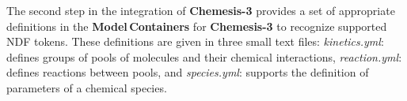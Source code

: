 \documentclass[11pt,3p,twocolumn]{JMN}
\begin{document}









The second step in the integration of {\bf Chemesis-3} provides a set of appropriate definitions in the {\bf Model\,Containers} for {\bf Chemesis-3} to recognize supported NDF tokens. These definitions are given in three small text files: {\it kinetics.yml}:  defines groups of pools of molecules and their chemical interactions, {\it reaction.yml}: defines reactions between pools, and {\it species.yml}: supports the definition of parameters of a chemical species.

\end{document}
